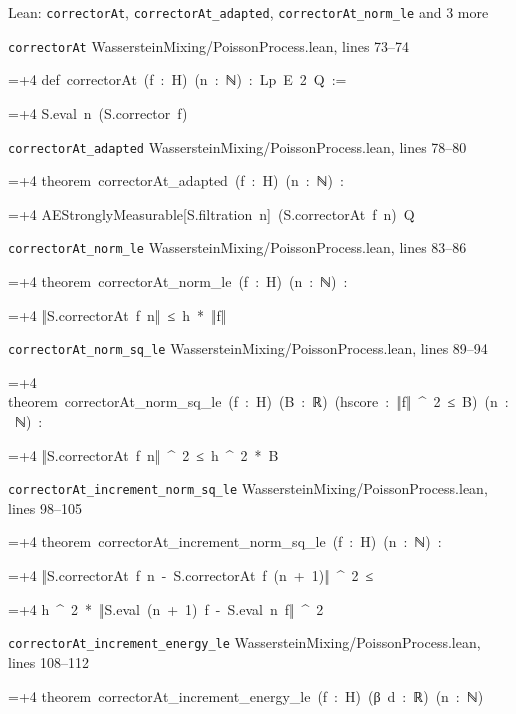 \documentclass[11pt,a4paper]{report}
\newlength{\leancharwidth}
\newenvironment{leancode}{\par\smallskip\begingroup\ttfamily\footnotesize\raggedright
  \settowidth{\leancharwidth}{M}\setlength{\parskip}{0pt}\setlength{\parindent}{0pt}
  \frenchspacing}{\par\endgroup\smallskip}
\newcommand{\leanline}[2]{\hangindent=\dimexpr#1\leancharwidth+4\leancharwidth\relax
  \hangafter=1\noindent\hspace*{#1\leancharwidth}#2\par}
\newcommand{\leansource}[1]{\par{\footnotesize\color{leanmuted}#1}\par}
\begin{document}
\begin{leanbox}{Lean: \texttt{correctorAt}, \texttt{correctorAt\_\allowbreak{}adapted}, \texttt{correctorAt\_\allowbreak{}norm\_\allowbreak{}le} and 3 more}
\leansource{\texttt{correctorAt} \quad WassersteinMixing/\allowbreak{}PoissonProcess.lean, lines 73–74}
\begin{leancode}
\leanline{0}{def\ correctorAt\ (f\ :\ H)\ (n\ :\ ℕ)\ :\ Lp\ E\ 2\ Q\ :=}
\leanline{2}{S.eval\ n\ (S.corrector\ f)}
\end{leancode}
\leansource{\texttt{correctorAt\_\allowbreak{}adapted} \quad WassersteinMixing/\allowbreak{}PoissonProcess.lean, lines 78–80}
\begin{leancode}
\leanline{0}{theorem\ correctorAt\_adapted\ (f\ :\ H)\ (n\ :\ ℕ)\ :}
\leanline{4}{AEStronglyMeasurable[S.filtration\ n]\ (S.correctorAt\ f\ n)\ Q}
\end{leancode}
\leansource{\texttt{correctorAt\_\allowbreak{}norm\_\allowbreak{}le} \quad WassersteinMixing/\allowbreak{}PoissonProcess.lean, lines 83–86}
\begin{leancode}
\leanline{0}{theorem\ correctorAt\_norm\_le\ (f\ :\ H)\ (n\ :\ ℕ)\ :}
\leanline{4}{‖S.correctorAt\ f\ n‖\ ≤\ h\ *\ ‖f‖}
\end{leancode}
\leansource{\texttt{correctorAt\_\allowbreak{}norm\_\allowbreak{}sq\_\allowbreak{}le} \quad WassersteinMixing/\allowbreak{}PoissonProcess.lean, lines 89–94}
\begin{leancode}
\leanline{0}{theorem\ correctorAt\_norm\_sq\_le\ (f\ :\ H)\ (B\ :\ ℝ)\ (hscore\ :\ ‖f‖\ \textasciicircum{}\ 2\ ≤\ B)\ (n\ :\ ℕ)\ :}
\leanline{4}{‖S.correctorAt\ f\ n‖\ \textasciicircum{}\ 2\ ≤\ h\ \textasciicircum{}\ 2\ *\ B}
\end{leancode}
\leansource{\texttt{correctorAt\_\allowbreak{}increment\_\allowbreak{}norm\_\allowbreak{}sq\_\allowbreak{}le} \quad WassersteinMixing/\allowbreak{}PoissonProcess.lean, lines 98–105}
\begin{leancode}
\leanline{0}{theorem\ correctorAt\_increment\_norm\_sq\_le\ (f\ :\ H)\ (n\ :\ ℕ)\ :}
\leanline{4}{‖S.correctorAt\ f\ n\ -\ S.correctorAt\ f\ (n\ +\ 1)‖\ \textasciicircum{}\ 2\ ≤}
\leanline{6}{h\ \textasciicircum{}\ 2\ *\ ‖S.eval\ (n\ +\ 1)\ f\ -\ S.eval\ n\ f‖\ \textasciicircum{}\ 2}
\end{leancode}
\leansource{\texttt{correctorAt\_\allowbreak{}increment\_\allowbreak{}energy\_\allowbreak{}le} \quad WassersteinMixing/\allowbreak{}PoissonProcess.lean, lines 108–112}
\begin{leancode}
\leanline{0}{theorem\ correctorAt\_increment\_energy\_le\ (f\ :\ H)\ (β\ d\ :\ ℝ)\ (n\ :\ ℕ)}

\end{leancode}
\end{leanbox}
\end{document}

